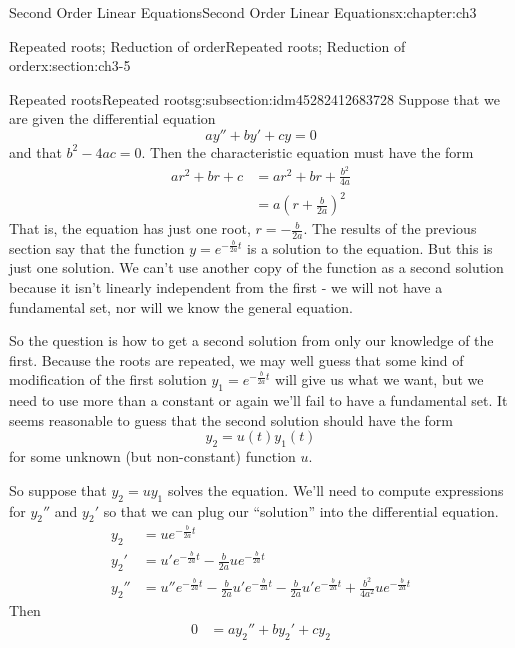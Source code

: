 \documentclass[oneside,10pt,]{book}
\numberwithin{equation}{section}
\numberwithin{equation}{section}
\newcommand{\amp}{&}
\begin{document}
\begin{chapterptx}{Second Order Linear Equations}{}{Second Order Linear Equations}{}{}{x:chapter:ch3}
\begin{sectionptx}{Repeated roots; Reduction of order}{}{Repeated roots; Reduction of order}{}{}{x:section:ch3-5}
%
%
\typeout{************************************************}
\typeout{************************************************}
%
\begin{subsectionptx}{Repeated roots}{}{Repeated roots}{}{}{g:subsection:idm45282412683728}
Suppose that we are given the differential equation%
\begin{equation*}
ay'' + by' + cy = 0
\end{equation*}
and that \(b^2 - 4ac = 0\). Then the characteristic equation must have the form%
\begin{align*}
ar^2 + br + c \amp= ar^2 + br + \frac{b^2}{4a}\\
\amp= a(r + \frac{b}{2a})^2
\end{align*}
That is, the equation has just one root, \(r = -\frac{b}{2a}\). The results of the previous section say that the function \(y = e^{-\frac{b}{2a} t}\) is a solution to the equation. But this is just one solution. We can't use another copy of the function as a second solution because it isn't linearly independent from the first - we will not have a fundamental set, nor will we know the general equation.%
\par
So the question is how to get a second solution from only our knowledge of the first. Because the roots are repeated, we may well guess that some kind of modification of the first solution \(y_1 = e^{-\frac{b}{2a} t}\) will give us what we want, but we need to use more than a constant or again we'll fail to have a fundamental set. It seems reasonable to guess that the second solution should have the form%
\begin{equation*}
y_2 = u(t) y_1(t)
\end{equation*}
for some unknown (but non-constant) function \(u\).%
\par
So suppose that \(y_2 = u y_1\) solves the equation. We'll need to compute expressions for \(y_2''\) and \(y_2'\) so that we can plug our ``solution'' into the differential equation.%
\begin{align*}
y_2 \amp= u e^{-\frac{b}{2a}t}\\
y_2' \amp= u' e^{-\frac{b}{2a}t} -\frac{b}{2a} u e^{-\frac{b}{2a}t}\\
y_2'' \amp= u'' e^{-\frac{b}{2a} t} - \frac{b}{2a} u' e^{-\frac{b}{2a}t} - \frac{b}{2a} u' e^{-\frac{b}{2a}t} + \frac{b^2}{4a^2} u e^{-\frac{b}{2a}t}
\end{align*}
Then%
\begin{align*}
0 \amp= ay_2'' + b y_2' + cy_2\\

\end{align*}
\end{subsectionptx}
\end{sectionptx}
\end{chapterptx}
\end{document}
